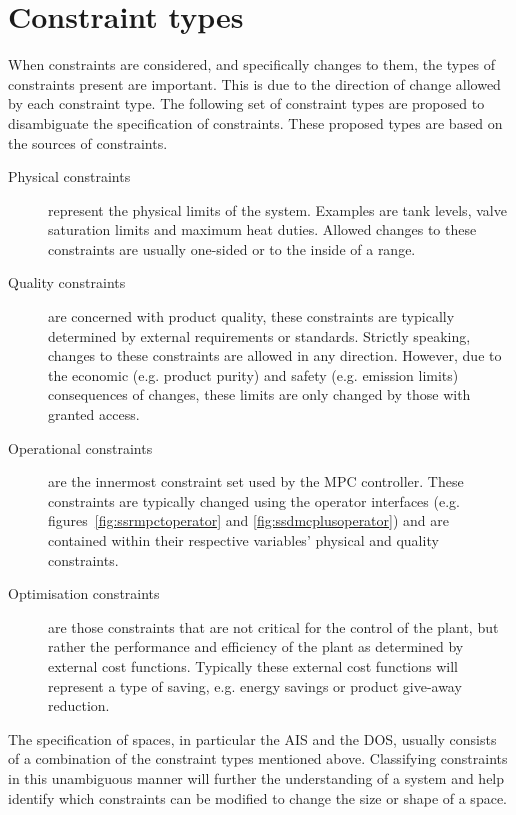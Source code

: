 \section{Constraint types}
When constraints are considered, and specifically changes to them, the types of constraints present are important.
This is due to the direction of change allowed by each constraint type.
The following set of constraint types are proposed to disambiguate the specification of constraints.
These proposed types are based on the sources of constraints.
\begin{description}
  \item [Physical constraints] represent the physical limits of the system.
  Examples are tank levels, valve saturation limits and maximum heat duties.
  Allowed changes to these constraints are usually one-sided or to the inside of a range.
  \item [Quality constraints] are concerned with product quality, these constraints are typically determined by external requirements or standards.
  Strictly speaking, changes to these constraints are allowed in any direction.
  However, due to the economic (e.g. product purity) and safety (e.g. emission limits) consequences of changes, these limits are only changed by those with granted access.
  \item [Operational constraints] are the innermost constraint set used by the MPC controller.
  These constraints are typically changed using the operator interfaces (e.g. figures~\ref{fig:ssrmpctoperator} and \ref{fig:ssdmcplusoperator}) and are contained within their respective variables' physical and quality constraints.
  \item [Optimisation constraints] are those constraints that are not critical for the control of the plant, but rather the performance and efficiency of the plant as determined by external cost functions.
  Typically these external cost functions will represent a type of saving, e.g. energy savings or product give-away reduction.
\end{description}

The specification of spaces, in particular the AIS and the DOS, usually consists of a combination of the constraint types mentioned above.
Classifying constraints in this unambiguous manner will further the understanding of a system and help identify which constraints can be modified to change the size or shape of a space.

